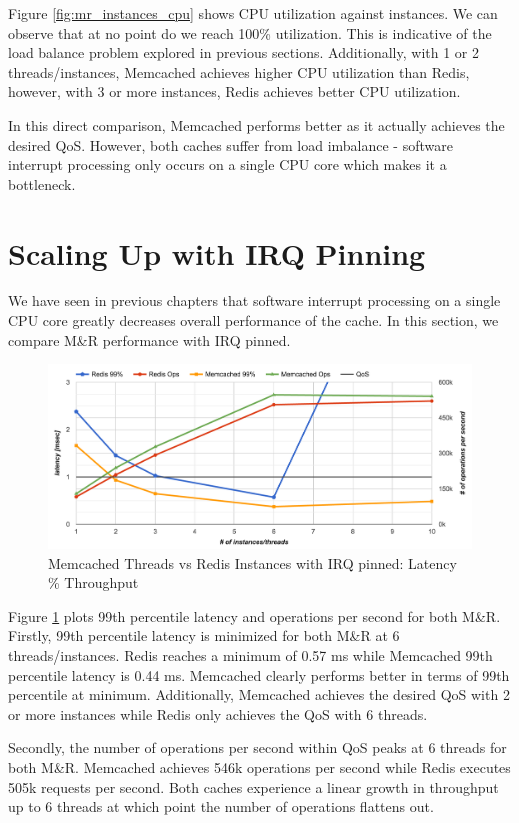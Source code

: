 Figure \ref{fig:mr_instances_cpu} shows CPU utilization against instances. We can observe that at no point do we reach 100\% utilization. This is indicative of the load balance problem explored in previous sections. Additionally, with 1 or 2 threads/instances, Memcached achieves higher CPU utilization than Redis, however, with 3 or more instances, Redis achieves better CPU utilization.

In this direct comparison, Memcached performs better as it actually achieves the desired QoS. However, both caches suffer from load imbalance - software interrupt processing only occurs on a single CPU core which makes it a bottleneck.


\section{Scaling Up with IRQ Pinning}
We have seen in previous chapters that software interrupt processing on a single CPU core greatly decreases overall performance of the cache. In this section, we compare M\&R performance with IRQ pinned.

\begin{figure}[h]
    \includegraphics[width=\textwidth]{./res2/mr_irq.png}
    \caption{Memcached Threads vs Redis Instances with IRQ pinned: Latency \% Throughput}
    \label{fig:mr_irq}
\end{figure}

Figure \ref{fig:mr_irq} plots 99th percentile latency and operations per second for both M\&R. Firstly, 99th percentile latency is minimized for both M\&R at 6 threads/instances. Redis reaches a minimum of 0.57 ms while Memcached 99th percentile latency is 0.44 ms. Memcached clearly performs better in terms of 99th percentile at minimum. Additionally, Memcached achieves the desired QoS with 2 or more instances while Redis only achieves the QoS with 6 threads.

Secondly, the number of operations per second within QoS peaks at 6 threads for both M\&R. Memcached achieves 546k operations per second while Redis executes 505k requests per second. Both caches experience a linear growth in throughput up to 6 threads at which point the number of operations flattens out.

